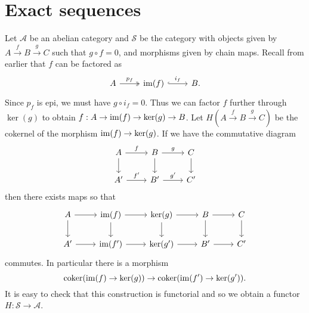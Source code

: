 \documentclass{memoir}
\begin{document}
\section{Exact sequences}
\label{sec:es}
Let $\mathcal A$ be an abelian category and $\mathcal S$ be the category with objects given by $A\xrightarrow{f} B\xrightarrow{g} C$ such that $g\circ f = 0$, and morphisms given by chain maps.
Recall from earlier that $f$ can be factored as
\begin{equation}
    \begin{tikzcd}
        A \arrow[r,twoheadrightarrow,"p_f"] & \im(f) \arrow[r,hookrightarrow,"i_f"] & B.
    \end{tikzcd}
\end{equation}
Since $p_f$ is epi, we must have $g\circ i_f = 0$.
Thus we can factor $f$ further through $\ker(g)$ to obtain $f:A\to\operatorname{im}(f)\to\ker(g)\to B$.
Let $H(A\xrightarrow{f} B\xrightarrow{g} C)$ be the cokernel of the morphism $\operatorname{im}(f)\to\ker(g)$.
If we have the commutative diagram
\begin{equation}
    \begin{tikzcd}
        A \arrow[r,"f"] \arrow[d] & B \arrow[r,"g"] \arrow[d] & C \arrow[d] \\
        A' \arrow[r,"f'"] & B' \arrow[r,"g'"] & C'
    \end{tikzcd}
\end{equation}
then there exists maps so that 
\begin{equation}
    \begin{tikzcd}
        A \arrow[r] \arrow[d] & \im(f) \arrow[r] \arrow[d] & \ker(g) \arrow[r] \arrow[d] & B \arrow[r] \arrow[d] & C \arrow[d] \\
        A' \arrow[r] & \im(f') \arrow[r] & \ker(g') \arrow[r] & B' \arrow[r] & C'
    \end{tikzcd}
\end{equation}
commutes.
In particular there is a morphism 
\begin{equation}
    \operatorname{coker}(\operatorname{im}(f)\to\ker(g))\to\operatorname{coker}(\operatorname{im}(f')\to\ker(g')).
\end{equation}
It is easy to check that this construction is functorial and so we obtain a functor $H:\mathcal S\to \mathcal A$.
\end{document}
